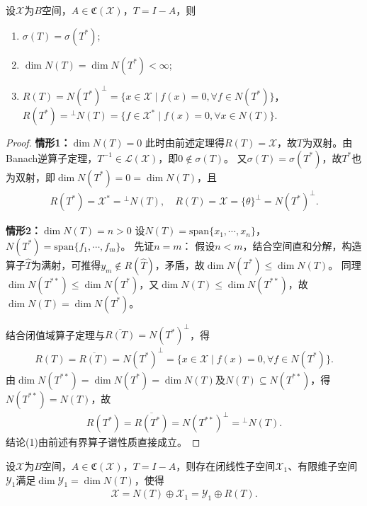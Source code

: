 \documentclass[../../main.tex]{subfiles}%
\begin{document}
\begin{theorem}\label{theorem:泛函分析--Riesz-Fredholm定理}
设$\mathscr{X}$为$B$空间，$A\in\mathfrak{C}(\mathscr{X})$，$T=I-A$，则
\begin{enumerate}[(1)]
\item $\sigma(T)=\sigma(T^*)$;
\item $\dim N(T)=\dim N(T^*)<\infty$;
\item $R(T)=N(T^*)^\perp=\{x\in\mathscr{X}\mid f(x)=0,\forall f\in N(T^*)\}$，\quad $R(T^*)={}^\perp N(T)=\{f\in\mathscr{X}^*\mid f(x)=0,\forall x\in N(T)\}$.
\end{enumerate}
\end{theorem}
\begin{proof}

\textbf{情形1：$\dim N(T)=0$}
此时由前述定理得$R(T)=\mathscr{X}$，故$T$为双射。由Banach逆算子定理，$T^{-1}\in\mathscr{L}(\mathscr{X})$，即$0\notin\sigma(T)$。
又$\sigma(T)=\sigma(T^*)$，故$T^*$也为双射，即$\dim N(T^*)=0=\dim N(T)$，且
\begin{align*}
R(T^*)=\mathscr{X}^*={}^\perp N(T),\quad R(T)=\mathscr{X}=\{\theta\}^\perp=N(T^*)^\perp.
\end{align*}

\textbf{情形2：$\dim N(T)=n>0$}
设$N(T)=\mathrm{span}\{x_1,\cdots,x_n\}$，$N(T^*)=\mathrm{span}\{f_1,\cdots,f_m\}$。
先证$n=m$：
假设$n<m$，结合空间直和分解，构造算子$\widehat{T}$为满射，可推得$y_m\notin R(\widehat{T})$，矛盾，故$\dim N(T^*)\leqslant\dim N(T)$。
同理$\dim N(T^{**})\leqslant\dim N(T^*)$，又$\dim N(T)\leqslant\dim N(T^{**})$，故$\dim N(T)=\dim N(T^*)$。

结合闭值域算子定理与$\overline{R(T)}=N(T^*)^\perp$，得
\begin{align*}
R(T)=\overline{R(T)}=N(T^*)^\perp=\{x\in\mathscr{X}\mid f(x)=0,\forall f\in N(T^*)\}.
\end{align*}
由$\dim N(T^{**})=\dim N(T^*)=\dim N(T)$及$N(T)\subseteq N(T^{**})$，得$N(T^{**})=N(T)$，故
\begin{align*}
R(T^*)=\overline{R(T^*)}=N(T^{**})^\perp={}^\perp N(T).
\end{align*}
结论(1)由前述有界算子谱性质直接成立。

\end{proof}

\begin{theorem}
设$\mathscr{X}$为$B$空间，$A\in\mathfrak{C}(\mathscr{X})$，$T=I-A$，则存在闭线性子空间$\mathscr{X}_1$、有限维子空间$\mathscr{Y}_1$满足$\dim\mathscr{Y}_1=\dim N(T)$，使得
\begin{align*}
\mathscr{X}=N(T)\oplus\mathscr{X}_1=\mathscr{Y}_1\oplus R(T).
\end{align*}
\end{theorem}
\end{document}
